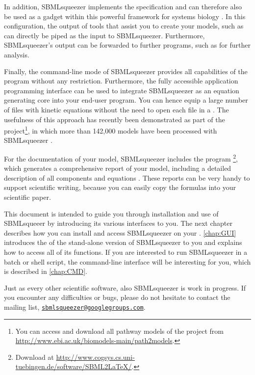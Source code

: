 In addition, SBMLsqueezer implements the \Garuda specification and can therefore
also be used as a gadget within this powerful framework for systems biology
\citep{Ghosh2011}. In this configuration, the output of tools that assist you
to create your models, such as \KEGGtranslator \citep{Wrzodek2011, Wrzodek2013}
can directly be piped as the input to SBMLsqueezer. Furthermore, SBMLsqueezer's
output can be forwarded to further programs, such as \SBMLsimulator
\citep{Keller2013} for further analysis.

Finally, the command-line mode of SBMLsqueezer provides all capabilities of the
program without any restriction.
Furthermore, the fully accessible application programming interface can be used
to integrate SBMLsqueezer as an equation generating core into your end-user
program.
You can hence equip a large number of files with kinetic equations without the
need to open each file in a \GUI.
The usefulness of this approach has recently been demonstrated as part of the
\pathmodels project\footnote{You can access and download all pathway models of the \pathmodels project from \url{http://www.ebi.ac.uk/biomodels-main/path2models}.},
in which more than 142,000 \SBML models have been processed with SBMLsqueezer
\citep{Buechel2013}.

For the documentation of your model, SBMLsqueezer includes the program
\SBMLLaTeX\footnote{Download \SBMLLaTeX at \url{http://www.cogsys.cs.uni-tuebingen.de/software/SBML2LaTeX/}.},
which generates a comprehensive report of your model, including a detailed
description of all components and equations \citep{Draeger2009b, Draeger2010a}.
These reports can be very handy to support scientific writing, because you can
easily copy the formulas into your scientific paper.

This document is intended to guide you through installation and use of
SBMLsqueeer by introducing its various interfaces to you. The next chapter
describes how you can install and access SBMLsqueezer on your \OS.
\vref{chap:GUI} introduces the \GUI of the stand-alone
version of SBMLsqueezer to you and explains how to access all of its functions.
If you are interested to run SBMLsqueezer in a batch or shell script, the
command-line interface will be interesting for you, which is described in
\vref{chap:CMD}.

Just as every other scientific software, also SBMLsqueezer is work in progress.
If you encounter any difficulties or bugs, please do not hesitate to contact
the mailing list,
\href{mailto:sbmlsqueezer@googlegroups.com}{\texttt{sbmlsqueezer@google\-groups.com}}.

